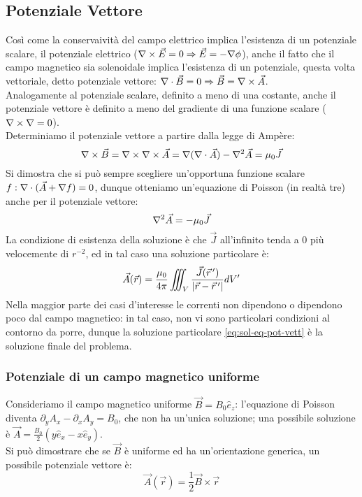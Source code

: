 \subsection{Potenziale Vettore}

Così come la conservaività del campo elettrico implica l'esistenza di un potenziale scalare, il potenziale elettrico ($ \nabla\times\vec{E} = 0 \Rightarrow \vec{E} = - \nabla \phi $), anche  il fatto che il campo magnetico sia solenoidale implica l'esistenza di un potenziale, questa volta vettoriale, detto potenziale vettore: $ \nabla\cdot\vec{B} = 0 \Rightarrow \vec{B} = \nabla\times\vec{A} $. \\ 
%
Analogamente al potenziale scalare, definito a meno di una costante, anche il potenziale vettore è definito a meno del gradiente di una funzione scalare ($ \nabla\times\nabla = 0 $). \\ 
%
Determiniamo il potenziale vettore a partire dalla legge di Ampère:
\begin{equation}
	\nabla\times\vec{B} = \nabla\times\nabla\times\vec{A} = \nabla(\nabla\cdot\vec{A}) - \nabla^2\vec{A} = \mu_0 \vec{J}
	\label{eq:}
\end{equation}
Si dimostra che si può sempre scegliere un'opportuna funzione scalare $ f : \nabla\cdot(\vec{A} + \nabla f) = 0 $, dunque otteniamo un'equazione di Poisson (in realtà tre) anche per il potenziale vettore:
\begin{equation}
	\nabla^2\vec{A} = - \mu_0 \vec{J}
	\label{eq:eq-pot-vett}
\end{equation}
La condizione di esistenza della soluzione è che $ \vec{J} $ all'infinito tenda a $ 0 $ più velocemente di $ r^{-2} $, ed in tal caso una soluzione particolare è:
\begin{equation}
	\vec{A}(\vec{r}) = \displaystyle\frac{\mu_0}{4\pi} \iiint_V \displaystyle\frac{\vec{J}(\vec{r}\,')}{\left\lvert\vec{r} - \vec{r}\,'\right\rvert} dV'
	\label{eq:sol-eq-pot-vett}
\end{equation}
Nella maggior parte dei casi d'interesse le correnti non dipendono o dipendono poco dal campo magnetico: in tal caso, non vi sono particolari condizioni al contorno da porre, dunque la soluzione particolare \ref{eq:sol-eq-pot-vett} è la soluzione finale del problema.

\subsubsection{Potenziale di un campo magnetico uniforme}

Consideriamo il campo magnetico uniforme $ \vec{B} = B_0 \hat{e}_z $: l'equazione di Poisson diventa $ \partial_y A_x - \partial_x A_y = B_0 $, che non ha un'unica soluzione; una possibile soluzione è $ \vec{A} = \frac{B_0}{2} (y\hat{e}_x - x\hat{e}_y) $. \\ 
%
Si può dimostrare che se $\vec{B} $ è uniforme ed ha un'orientazione generica, un possibile potenziale vettore è:
\begin{equation}
	\vec{A}(\vec{r}) = \displaystyle\frac{1}{2} \vec{B}\times\vec{r}
	\label{eq:pot-b-unif}
\end{equation}

